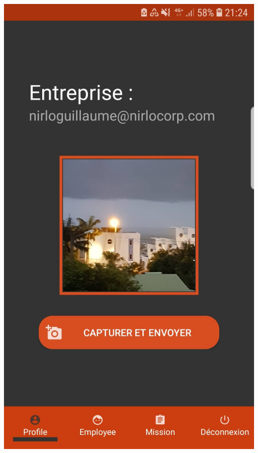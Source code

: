 \documentclass{article}
\begin{document}
\begin{center}
    \includegraphics[scale=0.1]{profil.jpg}

\end{center}
\end{document}
